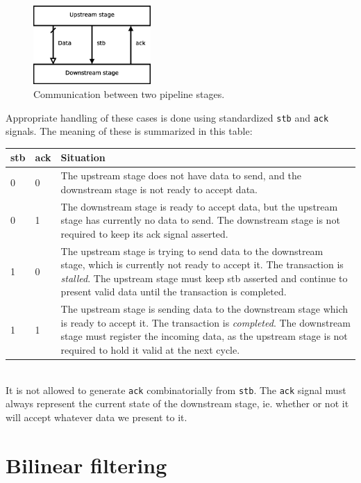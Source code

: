 \documentclass[a4paper,11pt]{article}
\begin{document}
\begin{figure}[H]
\centering
\includegraphics[height=30mm]{comm.eps}
\caption{Communication between two pipeline stages.}\label{fig:comm}
\end{figure}

Appropriate handling of these cases is done using standardized \verb!stb! and \verb!ack! signals. The meaning of these is summarized in this table:\\

\begin{tabularx}{\textwidth}{|l|l|X|}
\hline
\bf stb & \bf ack & \bf Situation \\
\hline
0 & 0 & The upstream stage does not have data to send, and the downstream stage is not ready to accept data. \\
\hline
0 & 1 & The downstream stage is ready to accept data, but the upstream stage has currently no data to send. The downstream stage is not required to keep its ack signal asserted. \\
\hline
1 & 0 & The upstream stage is trying to send data to the downstream stage, which is currently not ready to accept it. The transaction is \textit{stalled}. The upstream stage must keep stb asserted and continue to present valid data until the transaction is completed. \\
\hline
1 & 1 & The upstream stage is sending data to the downstream stage which is ready to accept it. The transaction is \textit{completed}. The downstream stage must register the incoming data, as the upstream stage is not required to hold it valid at the next cycle. \\
\hline
\end{tabularx}\\

It is not allowed to generate \verb!ack! combinatorially from \verb!stb!. The \verb!ack! signal must always represent the current state of the downstream stage, ie. whether or not it will accept whatever data we present to it.

\section{Bilinear filtering}
\end{document}
